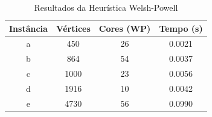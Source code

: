 \begin{table}
\centering
\caption{Resultados da Heurística Welsh-Powell}
\label{tab:resultados_welsh_powell_2}
\begin{tabular}{cccc}
\toprule
Instância & Vértices & Cores (WP) & Tempo (s) \\
\midrule
a & 450 & 26 & 0.0021 \\
b & 864 & 54 & 0.0037 \\
c & 1000 & 23 & 0.0056 \\
d & 1916 & 10 & 0.0042 \\
e & 4730 & 56 & 0.0990 \\
\bottomrule
\end{tabular}
\end{table}
